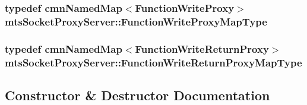 \subsubsection[{Function\+Write\+Proxy\+Map\+Type}]{\setlength{\rightskip}{0pt plus 5cm}typedef {\bf cmn\+Named\+Map}$<$Function\+Write\+Proxy$>$ {\bf mts\+Socket\+Proxy\+Server\+::\+Function\+Write\+Proxy\+Map\+Type}\hspace{0.3cm}{\ttfamily [protected]}}\label{classmts_socket_proxy_server_ae84115470284d069bbd2856f4fa11e43}
\hypertarget{classmts_socket_proxy_server_ab8976dbfc7fa5afbb1f02e7cddc2d71d}{}
\subsubsection[{Function\+Write\+Return\+Proxy\+Map\+Type}]{\setlength{\rightskip}{0pt plus 5cm}typedef {\bf cmn\+Named\+Map}$<$Function\+Write\+Return\+Proxy$>$ {\bf mts\+Socket\+Proxy\+Server\+::\+Function\+Write\+Return\+Proxy\+Map\+Type}\hspace{0.3cm}{\ttfamily [protected]}}\label{classmts_socket_proxy_server_ab8976dbfc7fa5afbb1f02e7cddc2d71d}


\subsection{Constructor \& Destructor Documentation}
\hypertarget{classmts_socket_proxy_server_a6ebb4c4b1dfaa429094b3fdac1659471}{}
